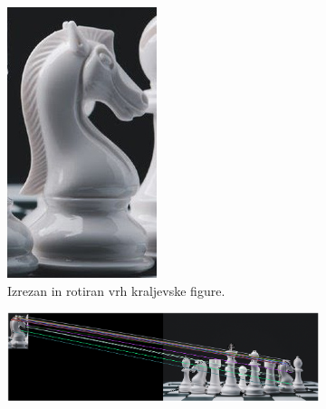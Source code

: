 \documentclass[a4paper,11pt]{article}
\begin{document}
\begin{figure}[hb]
	\centering
	\begin{subfigure}[t]{0.2\textwidth}
		\centering
		\includegraphics[width=\textwidth]{images/chess-knight.jpg}
		\caption{Izrezan in rotiran vrh kraljevske figure.} 
		\label{img:chess_knight}
	\end{subfigure}
	\begin{subfigure}[t]{1\textwidth}
		\centering
			\includegraphics[width=1\textwidth]{images/match_object.png}

\end{subfigure}
\end{figure}
\end{document}
